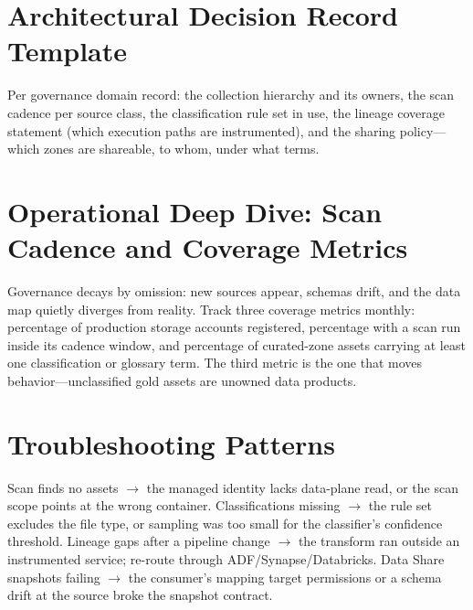 \section{Architectural Decision Record Template}
Per governance domain record: the collection hierarchy and its owners, the scan cadence per source class, the classification rule set in use, the lineage coverage statement (which execution paths are instrumented), and the sharing policy---which zones are shareable, to whom, under what terms.

\section{Operational Deep Dive: Scan Cadence and Coverage Metrics}
Governance decays by omission: new sources appear, schemas drift, and the data map quietly diverges from reality. Track three coverage metrics monthly: percentage of production storage accounts registered, percentage with a scan run inside its cadence window, and percentage of curated-zone assets carrying at least one classification or glossary term. The third metric is the one that moves behavior---unclassified gold assets are unowned data products.

\section{Troubleshooting Patterns}
Scan finds no assets $\rightarrow$ the managed identity lacks data-plane read, or the scan scope points at the wrong container. Classifications missing $\rightarrow$ the rule set excludes the file type, or sampling was too small for the classifier's confidence threshold. Lineage gaps after a pipeline change $\rightarrow$ the transform ran outside an instrumented service; re-route through ADF/Synapse/Databricks. Data Share snapshots failing $\rightarrow$ the consumer's mapping target permissions or a schema drift at the source broke the snapshot contract.

